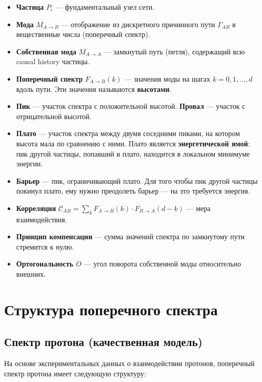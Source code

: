 \documentclass[12pt,a4paper]{article}
\begin{document}
\begin{itemize}
    \item \textbf{Частица} $P_i$ --- фундаментальный узел сети.
    \item \textbf{Мода} $M_{A \to B}$ --- отображение из дискретного причинного пути $\Gamma_{AB}$ в вещественные числа (поперечный спектр).
    \item \textbf{Собственная мода} $M_{A \to A}$ --- замкнутый путь (петля), содержащий всю causal history частицы.
    \item \textbf{Поперечный спектр} $F_{A \to B}(k)$ --- значения моды на шагах $k = 0, 1, \dots, d$ вдоль пути. Эти значения называются \textbf{высотами}.
    \item \textbf{Пик} --- участок спектра с положительной высотой. \textbf{Провал} --- участок с отрицательной высотой.
    \item \textbf{Плато} --- участок спектра между двумя соседними пиками, на котором высота мала по сравнению с ними. Плато является \textbf{энергетической ямой}: пик другой частицы, попавший в плато, находится в локальном минимуме энергии.
    \item \textbf{Барьер} --- пик, ограничивающий плато. Для того чтобы пик другой частицы покинул плато, ему нужно преодолеть барьер --- на это требуется энергия.
    \item \textbf{Корреляция} $\mathcal{C}_{AB} = \sum_k F_{A \to B}(k) \cdot F_{B \to A}(d-k)$ --- мера взаимодействия.
    \item \textbf{Принцип компенсации} --- сумма значений спектра по замкнутому пути стремится к нулю.
    \item \textbf{Ортогональность $O$} --- угол поворота собственной моды относительно внешних.
\end{itemize}

\section{Структура поперечного спектра}

\subsection{Спектр протона (качественная модель)}
На основе экспериментальных данных о взаимодействии протонов, поперечный спектр протона имеет следующую структуру:
\end{document}
